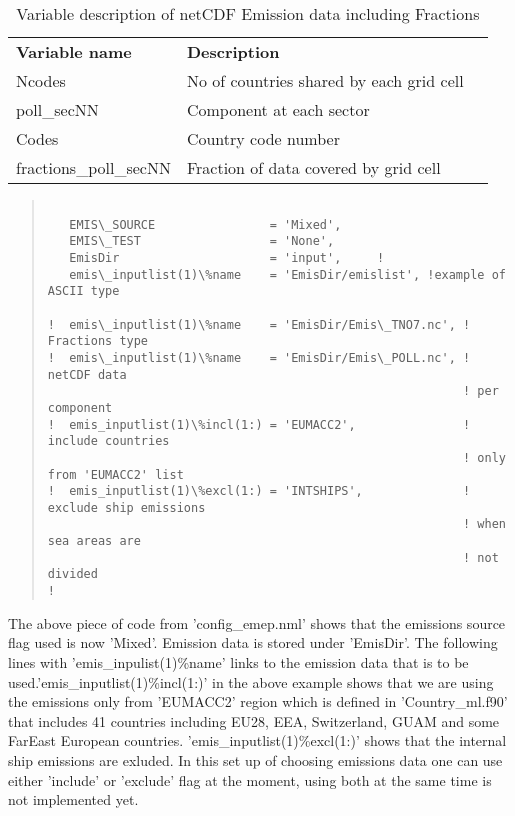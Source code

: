 \begin{center}
\begin{table}
\caption[fracemi]{Variable description of netCDF Emission data including Fractions
\label{Tab:Emisdata}}
\begin{tabular}{lll}
\hline


{\bf Variable name } & {\bf Description}\\

Ncodes & No of countries shared by each grid cell\\
poll\_secNN & Component at each sector \\
Codes & Country code number \\
fractions\_poll\_secNN & Fraction of data covered by grid cell\\

\hline
\end{tabular}
\end{table}
\end{center}



\begin{quote}
\begin{verbatim}

   EMIS\_SOURCE                = 'Mixed',
   EMIS\_TEST                  = 'None', 
   EmisDir                     = 'input',     !
   emis\_inputlist(1)\%name    = 'EmisDir/emislist', !example of ASCII type

!  emis\_inputlist(1)\%name    = 'EmisDir/Emis\_TNO7.nc', ! Fractions type
!  emis\_inputlist(1)\%name    = 'EmisDir/Emis\_POLL.nc', ! netCDF data 
                                                          ! per component
!  emis_inputlist(1)\%incl(1:) = 'EUMACC2',               ! include countries  
                                                          ! only from 'EUMACC2' list
!  emis_inputlist(1)\%excl(1:) = 'INTSHIPS',              ! exclude ship emissions 
                                                          ! when sea areas are 
							  						      ! not divided
! 
\end{verbatim}
\end{quote}

The above piece of code from 'config\_emep.nml' shows that the emissions source flag used is now 'Mixed'.  Emission data is stored under 'EmisDir'.  The following lines with 'emis\_inpulist(1)\%name' links to the emission data that is to be used.'emis\_inputlist(1)\%incl(1:)' in the above example shows that we are using the emissions only from 'EUMACC2' region which is defined in 'Country\_ml.f90' that includes 41 countries including EU28, EEA, Switzerland, GUAM and some FarEast European countries.  'emis\_inputlist(1)\%excl(1:)' shows that the internal ship emissions are exluded.  In this set up of choosing emissions data one can use either 'include' or 'exclude' flag at the moment, using both at the same time is not implemented yet.  


